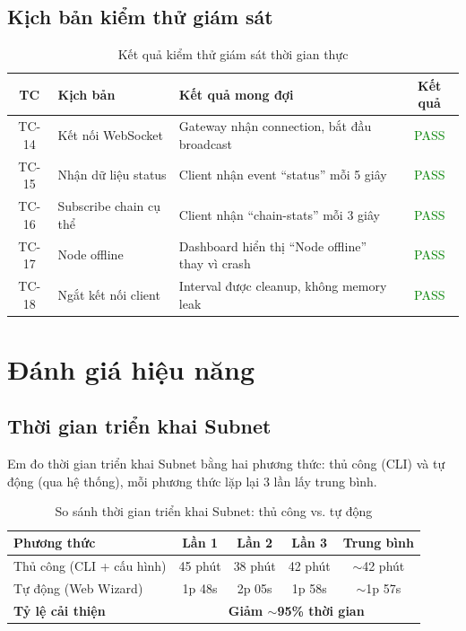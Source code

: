 \subsection{Kịch bản kiểm thử giám sát}

\begin{table}[H]
\centering
\caption{Kết quả kiểm thử giám sát thời gian thực}
\label{tab:test_monitoring}
\begin{tabular}{|c|p{4cm}|p{4cm}|c|}
\hline
\textbf{TC} & \textbf{Kịch bản} & \textbf{Kết quả mong đợi} & \textbf{Kết quả} \\ \hline
TC-14 & Kết nối WebSocket & Gateway nhận connection, bắt đầu broadcast & \textcolor{green}{PASS} \\ \hline
TC-15 & Nhận dữ liệu status & Client nhận event ``status'' mỗi 5 giây & \textcolor{green}{PASS} \\ \hline
TC-16 & Subscribe chain cụ thể & Client nhận ``chain-stats'' mỗi 3 giây & \textcolor{green}{PASS} \\ \hline
TC-17 & Node offline & Dashboard hiển thị ``Node offline'' thay vì crash & \textcolor{green}{PASS} \\ \hline
TC-18 & Ngắt kết nối client & Interval được cleanup, không memory leak & \textcolor{green}{PASS} \\ \hline
\end{tabular}
\end{table}

\section{Đánh giá hiệu năng}

\subsection{Thời gian triển khai Subnet}

Em đo thời gian triển khai Subnet bằng hai phương thức: thủ công (CLI) và tự động (qua hệ thống), mỗi phương thức lặp lại 3 lần lấy trung bình.

\begin{table}[H]
\centering
\caption{So sánh thời gian triển khai Subnet: thủ công vs. tự động}
\label{tab:deployment_time}
\begin{tabular}{|l|c|c|c|c|}
\hline
\textbf{Phương thức} & \textbf{Lần 1} & \textbf{Lần 2} & \textbf{Lần 3} & \textbf{Trung bình} \\ \hline
Thủ công (CLI + cấu hình) & 45 phút & 38 phút & 42 phút & $\sim$42 phút \\ \hline
Tự động (Web Wizard) & 1p 48s & 2p 05s & 1p 58s & $\sim$1p 57s \\ \hline
\textbf{Tỷ lệ cải thiện} & \multicolumn{4}{c|}{\textbf{Giảm $\sim$95\% thời gian}} \\ \hline
\end{tabular}
\end{table}

